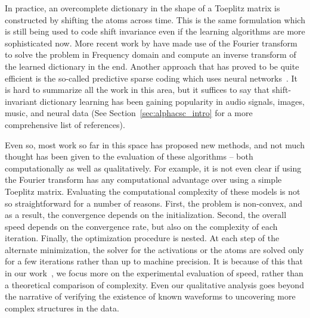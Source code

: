 In practice, an overcomplete dictionary in the shape of a Toeplitz matrix is constructed by shifting the atoms across time. This is the same formulation which is still being used to code shift invariance even if the learning algorithms are more sophisticated now. More recent work by \cite{grosse2012shift} have made use of the Fourier transform to solve the problem in Frequency domain and compute an inverse transform of the learned dictionary in the end. Another approach that has proved to be quite efficient is the so-called predictive sparse coding which uses neural networks~\citep{kavukcuoglu2010learning}. It is hard to summarize all the work in this area, but it suffices to say that shift-invariant dictionary learning has been gaining popularity in audio signals, images, music, and neural data (See Section~\ref{sec:alphacsc_intro} for a more comprehensive list of references).

Even so, most work so far in this space has proposed new methods, and not much thought has been given to the evaluation of these algorithms -- both computationally as well as qualitatively. For example, it is not even clear if using the Fourier transform has any computational advantage over using a simple Toeplitz matrix. Evaluating the computational complexity of these models is not so straightforward for a number of reasons. First, the problem is non-convex, and as a result, the convergence depends on the initialization. Second, the overall speed depends on the convergence rate, but also on the complexity of each iteration. Finally, the optimization procedure is nested. At each step of the alternate minimization, the solver for the activations or the atoms are solved only for a few iterations rather than up to machine precision. It is because of this that in our work~\citep{jas2017learning}, we focus more on the experimental evaluation of speed, rather than a theoretical comparison of complexity. Even our qualitative analysis goes beyond the narrative of verifying the existence of known waveforms to uncovering more complex structures in the data. 

